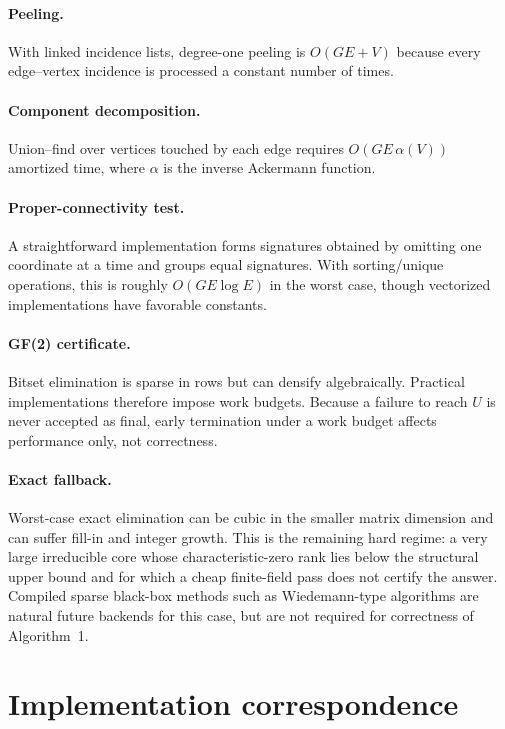 \documentclass[11pt]{article}
\theoremstyle{definition}
\newcommand{\1}{\mathbf{1}}
\begin{document}
\paragraph{Peeling.}
With linked incidence lists, degree-one peeling is $O(GE+V)$ because every edge--vertex incidence is processed a constant number of times.

\paragraph{Component decomposition.}
Union--find over vertices touched by each edge requires $O(GE\,\alpha(V))$ amortized time, where $\alpha$ is the inverse Ackermann function.

\paragraph{Proper-connectivity test.}
A straightforward implementation forms signatures obtained by omitting one coordinate at a time and groups equal signatures. With sorting/unique operations, this is roughly $O(GE\log E)$ in the worst case, though vectorized implementations have favorable constants.

\paragraph{GF(2) certificate.}
Bitset elimination is sparse in rows but can densify algebraically. Practical implementations therefore impose work budgets. Because a failure to reach $U$ is never accepted as final, early termination under a work budget affects performance only, not correctness.

\paragraph{Exact fallback.}
Worst-case exact elimination can be cubic in the smaller matrix dimension and can suffer fill-in and integer growth. This is the remaining hard regime: a very large irreducible core whose characteristic-zero rank lies below the structural upper bound and for which a cheap finite-field pass does not certify the answer. Compiled sparse black-box methods such as Wiedemann-type algorithms are natural future backends for this case, but are not required for correctness of Algorithm~1.

\section{Implementation correspondence}
\end{document}
